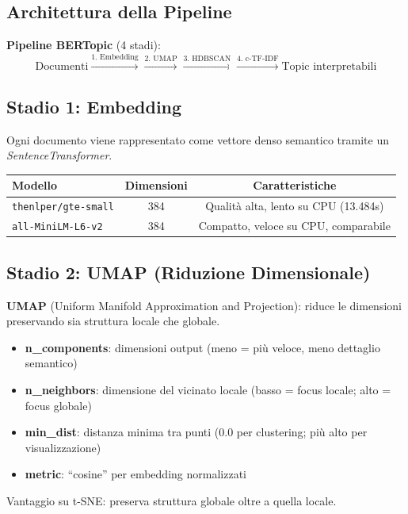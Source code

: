 \documentclass[12pt,a4paper]{article}
\begin{document}
\subsection{Architettura della Pipeline}

\begin{defbox}
\textbf{Pipeline BERTopic} (4 stadi):
\[
\text{Documenti} \xrightarrow{\text{1. Embedding}} \xrightarrow{\text{2. UMAP}} \xrightarrow{\text{3. HDBSCAN}} \xrightarrow{\text{4. c-TF-IDF}} \text{Topic interpretabili}
\]
\end{defbox}

\subsection{Stadio 1: Embedding}

Ogni documento viene rappresentato come vettore denso semantico tramite un \emph{SentenceTransformer}.

\begin{center}
\begin{tabular}{lcc}
\toprule
\textbf{Modello} & \textbf{Dimensioni} & \textbf{Caratteristiche} \\
\midrule
\texttt{thenlper/gte-small} & 384 & Qualit\`a alta, lento su CPU (13.484s) \\
\texttt{all-MiniLM-L6-v2} & 384 & Compatto, veloce su CPU, comparabile \\
\bottomrule
\end{tabular}
\end{center}

\subsection{Stadio 2: UMAP (Riduzione Dimensionale)}

\begin{defbox}
\textbf{UMAP} (Uniform Manifold Approximation and Projection): riduce le dimensioni preservando sia struttura locale che globale.
\begin{itemize}
  \item \textbf{n\_components}: dimensioni output (meno = pi\`u veloce, meno dettaglio semantico)
  \item \textbf{n\_neighbors}: dimensione del vicinato locale (basso = focus locale; alto = focus globale)
  \item \textbf{min\_dist}: distanza minima tra punti (0.0 per clustering; pi\`u alto per visualizzazione)
  \item \textbf{metric}: ``cosine'' per embedding normalizzati
\end{itemize}
Vantaggio su t-SNE: preserva struttura globale oltre a quella locale.
\end{defbox}
\end{document}
